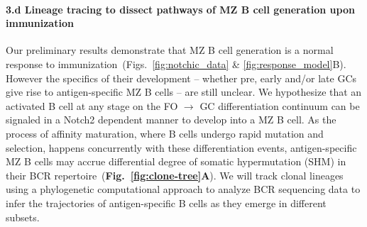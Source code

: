 \documentclass[11pt]{article}
\newcommand{\para}[1]{\vspace*{-4.5mm}\paragraph{#1}}
\newcommand{\red}[1]{{\color{red}{#1}}}
\begin{document}
%
%



\para{3.d Lineage tracing to dissect pathways of MZ B cell generation upon immunization}
Our preliminary results demonstrate that MZ B cell generation is a normal response to immunization~(Figs.~\ref{fig:notchic_data} \& \ref{fig:response_model}B).
However the specifics of their development -- whether pre, early and/or late GCs give rise to antigen-specific MZ B cells -- are still unclear.
We hypothesize that an activated B cell at any stage on the FO $\rightarrow$ GC differentiation continuum can be signaled in a Notch2 dependent manner to develop into a MZ B cell.
As the process of affinity maturation, where B cells undergo rapid mutation and selection, happens concurrently with these differentiation events, antigen-specific MZ B cells  may accrue differential degree of somatic hypermutation (SHM) in their BCR repertoire~(\textbf{Fig.~\ref{fig:clone-tree}A}).
We will track clonal lineages %
using a phylogenetic computational approach to analyze BCR sequencing data to infer the trajectories of antigen-specific B cells as they emerge in different subsets. %
\end{document}
